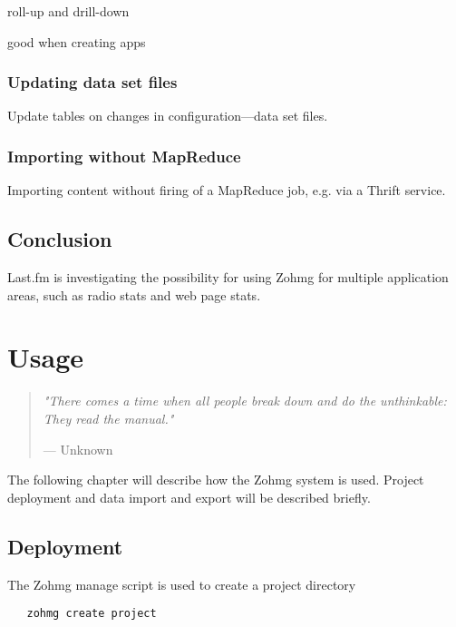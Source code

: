 \documentclass[a4paper,10pt]{book}
\newcommand{\chapterquote}[2] {
\begin{quote}
\textit{"{#1}"}

--- {#2}
\end{quote}

\vspace{24pt}
}
\begin{document}
roll-up and drill-down

good when creating apps


\subsection{Updating data set files}

Update tables on changes in configuration---data set files.


\subsection{Importing without MapReduce}

Importing content without firing of a MapReduce job, e.g. via a Thrift
service.



\section{Conclusion}

Last.fm is investigating the possibility for using Zohmg for multiple
application areas, such as radio stats and web page stats.


\pagebreak



 



\appendix



\chapter{Usage}

\chapterquote{There comes a time when all people break down and do the
unthinkable: They read the manual.}{Unknown}

\noindent The following chapter will describe how the Zohmg system is used.
Project deployment and data import and export will be described briefly.

\section{Deployment}

The Zohmg manage script is used to create a project directory

\begin{verbatim}
   zohmg create project
\end{verbatim}
\end{document}
